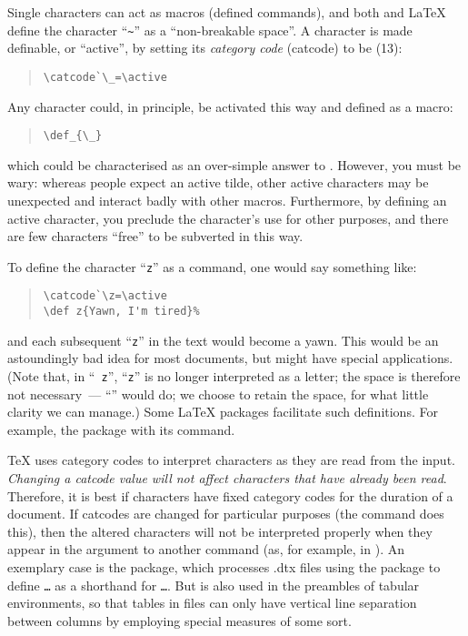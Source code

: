 Single characters can act as macros (defined commands), and both
\plaintex{} and \LaTeX{} define the character
``\texttt{\textasciitilde}'' as a ``non-breakable space''.  A
character is made definable, or ``active'', by setting its
\emph{category code} (catcode) to be  (13):
\begin{quote}
\begin{verbatim}
\catcode`\_=\active
\end{verbatim}
\end{quote}
Any character could, in principle, be activated this way and defined
as a macro:
\begin{quote}
\begin{verbatim}
\def_{\_}
\end{verbatim}
\end{quote}
which could be characterised as an over-simple answer to %
.  However, you must be
wary: whereas people expect an active tilde, other active characters
may be unexpected and interact badly with other macros.  Furthermore,
by defining an active character, you preclude the character's use for
other purposes, and there are few characters ``free'' to be subverted
in this way.

To define the character ``\texttt{z}'' as a command, one would say something
like:
\begin{quote}
\begin{verbatim}
\catcode`\z=\active
\def z{Yawn, I'm tired}%
\end{verbatim}
\end{quote}
and each subsequent ``\texttt{z}'' in the text would become a
yawn. This would be an astoundingly bad idea for most documents, but
might have special applications.  (Note that, in 
``\texttt{  z}'', 
``\texttt{z}'' is no longer interpreted as a letter; the space
is therefore not necessary~--- ``'' would do; we choose to
retain the space, for what little clarity we can manage.)
Some \LaTeX{} packages facilitate such definitions. For example, the
 package with its  command.

\TeX{} uses category codes to interpret characters as they are read 
from the input.
\emph{Changing a catcode value will not affect characters that have already been read}.
Therefore, it is best if characters have fixed category codes for the
duration of a document.  If catcodes are changed for particular
purposes (the  command does this), then the altered
characters will not be interpreted properly when they  appear in the
argument to another command (as, for example, in
).
An exemplary case is the  package, which processes .dtx
files using the  package to define
\texttt{\textbar\dots{}\textbar} as a shorthand for
\texttt{\textbar\dots{}\textbar}. But \texttt{\textbar} is
also used in the preambles of tabular environments, so that tables in
 files can only have vertical line separation between
columns by employing special measures of some sort.

